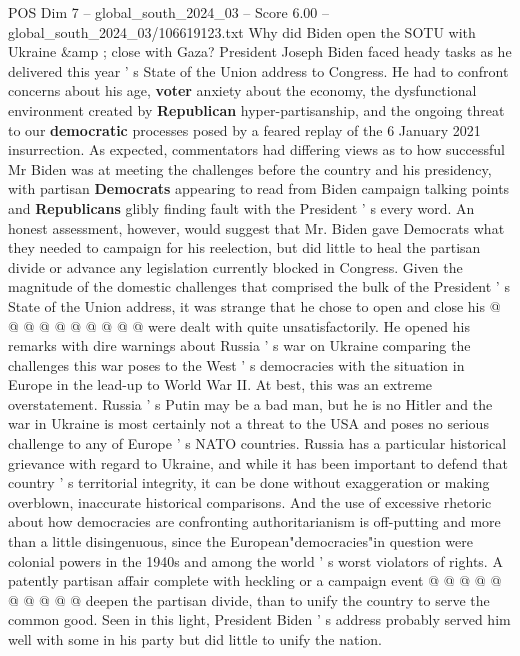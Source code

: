 \begin{textsample}{POS Dim 7 – global\_south\_2024\_03 – Score 6.00 – global\_south\_2024\_03/106619123.txt}  \label{ex:f7_pos_166}
Why did Biden open the SOTU with Ukraine \&amp ; close with Gaza?
President Joseph Biden faced heady tasks as he delivered this year ' s State of the Union address to Congress.
He had to confront concerns about his age, \textbf{voter} anxiety about the economy, the dysfunctional environment created by \textbf{Republican} hyper-partisanship, and the ongoing threat to our \textbf{democratic} processes posed by a feared replay of the 6 January 2021 insurrection.
As expected, commentators had differing views as to how successful Mr Biden was at meeting the challenges before the country and his presidency, with partisan \textbf{Democrats} appearing to read from Biden campaign talking points and \textbf{Republicans} glibly finding fault with the President ' s every word.
An honest assessment, however, would suggest that Mr.
Biden gave Democrats what they needed to campaign for his reelection, but did little to heal the partisan divide or advance any legislation currently blocked in Congress.
Given the magnitude of the domestic challenges that comprised the bulk of the President ' s State of the Union address, it was strange that he chose to open and close his @ @ @ @ @ @ @ @ @ @ were dealt with quite unsatisfactorily.
He opened his remarks with dire warnings about Russia ' s war on Ukraine comparing the challenges this war poses to the West ' s democracies with the situation in Europe in the lead-up to World War II.
At best, this was an extreme overstatement.
Russia ' s Putin may be a bad man, but he is no Hitler and the war in Ukraine is most certainly not a threat to the USA and poses no serious challenge to any of Europe ' s NATO countries.
Russia has a particular historical grievance with regard to Ukraine, and while it has been important to defend that country ' s territorial integrity, it can be done without exaggeration or making overblown, inaccurate historical comparisons.
And the use of excessive rhetoric about how democracies are confronting authoritarianism is off-putting and more than a little disingenuous, since the European"democracies"in question were colonial powers in the 1940s and among the world ' s worst violators of rights.
A patently partisan affair complete with heckling or a campaign event @ @ @ @ @ @ @ @ @ @ deepen the partisan divide, than to unify the country to serve the common good.
Seen in this light, President Biden ' s address probably served him well with some in his party but did little to unify the nation.

\end{textsample}
